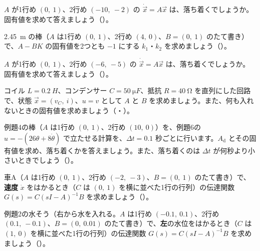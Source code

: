 \bkproblem $A$ が1行め $(0,\ 1)$、2行め $(-10,\ -2)$ の $\dot{\vec x}=A\vec x$ は、落ち着くでしょうか。固有値を求めて答えましょう\mbox{（）}。

\bkproblem \qty{2.45}{m} の棒（$A$ は1行め $(0,\ 1)$、2行め $(4,\ 0)$、$B=(0,\ 1)$ のたて書き）で、$A-BK$ の固有値を2つとも $-1$ にする $k_1$・$k_2$ を求めましょう\mbox{（）}。

\bkproblem $A$ が1行め $(0,\ 1)$、2行め $(-6,\ -5)$ の $\dot{\vec x}=A\vec x$ は、落ち着くでしょうか。固有値を求めて答えましょう\mbox{（）}。


\bkproblem コイル $L=\qty{0.2}{H}$、コンデンサー $C=\qty{50}{\micro F}$、抵抗 $R=\qty{40}{\ohm}$ を直列にした回路で、状態 $\vec x=(v_C,\ i)$、$u=v$ として $A$ と $B$ を求めましょう。また、何も入れないときの固有値を求めましょう\mbox{（・）}。

\bkproblem 例題4の棒（$A$ は1行め $(0,\ 1)$、2行め $(10,\ 0)$）を、例題6の $u=-(26\theta+8\dot\theta)$ で立たせる計算を、$\Delta t=0.1$ 秒ごとに行います。$A_{\mathrm d}$ とその固有値を求め、落ち着くかを答えましょう。また、落ち着くのは $\Delta t$ が何秒より小さいときでしょう\mbox{（）}。

\bkproblem 車A（$A$ は1行め $(0,\ 1)$、2行め $(-2,\ -3)$、$B=(0,\ 1)$ のたて書き）で、\textbf{速度} $\dot x$ をはかるとき（$C$ は $(0,\ 1)$ を横に並べた1行の行列）の伝達関数 $G(s)=C(sI-A)^{-1}B$ を求めましょう\mbox{（）}。

\bkproblem 例題2の水そう（右から水を入れる。$A$ は1行め $(-0.1,\ 0.1)$、2行め $(0.1,\ -0.1)$、$B=(0,\ 0.01)$ のたて書き）で、\textbf{左}の水位をはかるとき（$C$ は $(1,\ 0)$ を横に並べた1行の行列）の伝達関数 $G(s)=C(sI-A)^{-1}B$ を求めましょう\mbox{（）}。

